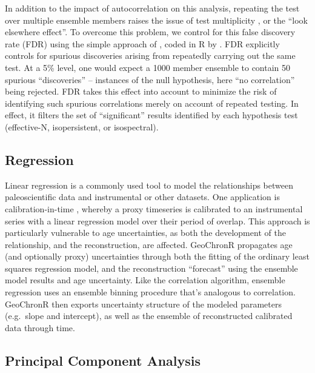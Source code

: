 \documentclass[gchron, manuscript]{copernicus}
\begin{document}
In addition to the impact of autocorrelation on this analysis, repeating the test over multiple ensemble members raises the issue of test multiplicity \citep{Ventura2004}, or the ``look elsewhere effect''.
To overcome this problem, we control for this false discovery rate (FDR) using the simple approach of \citet{BenjaminiHochberg95}, coded in R by \citet{Ventura2004}.
FDR explicitly controls for spurious discoveries arising from repeatedly carrying out the same test.
At a 5\% level, one would expect a 1000 member ensemble to contain 50 spurious ``discoveries'' -- instances of the null hypothesis, here ``no correlation'' being rejected.
FDR takes this effect into account to minimize the risk of identifying such spurious correlations merely on account of repeated testing.
In effect, it filters the set of ``significant'' results identified by each hypothesis test (effective-N, isopersistent, or isospectral).

\subsection{Regression}

Linear regression is a commonly used tool to model the relationships between paleoscientific data and instrumental or other datasets.
One application is calibration-in-time \citep{grosjean2009calibration}, whereby a proxy timeseries is calibrated to an instrumental series with a linear regression model over their period of overlap.
This approach is particularly vulnerable to age uncertainties, as both the development of the relationship, and the reconstruction, are affected.
GeoChronR propagates age (and optionally proxy) uncertainties through both the fitting of the ordinary least squares regression model, and the reconstruction ``forecast'' using the ensemble model results and age uncertainty.
Like the correlation algorithm, ensemble regression uses an ensemble binning procedure that's analogous to correlation.
GeoChronR then exports uncertainty structure of the modeled parameters (e.g.~slope and intercept), as well as the ensemble of reconstructed calibrated data through time.

\subsection{Principal Component Analysis}
\end{document}
